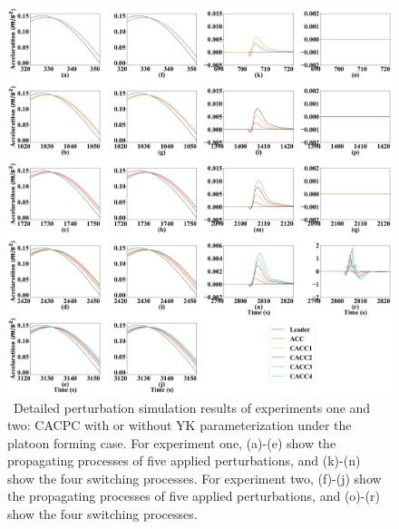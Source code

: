 \documentclass[trsc,nonblindrev]{informs3} %
\begin{document}
\begin{figure}
    \centering
    \includegraphics[width=14cm]{figs/form_detail.png}
    \caption{~Detailed perturbation simulation results of experiments one and two: CACPC with or without YK parameterization under the platoon forming case. For experiment one, (a)-(e) show the propagating processes of five applied perturbations, and (k)-(n) show the four switching processes. For experiment two, (f)-(j) show the propagating processes of five applied perturbations, and (o)-(r) show the four switching processes.}
    \label{new2}
\end{figure}
\end{document}
